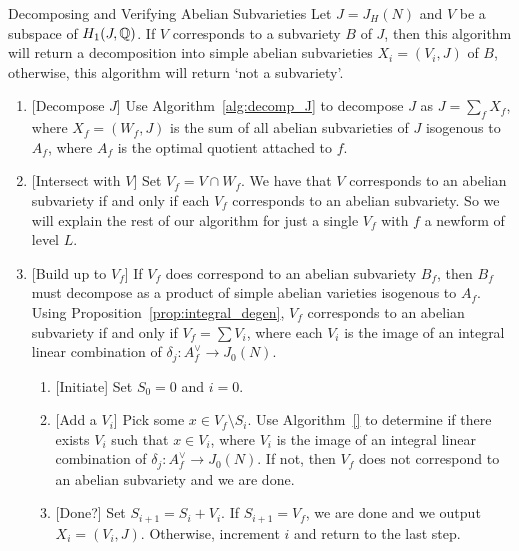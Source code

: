 \begin{algorithm}{Decomposing and Verifying Abelian Subvarieties}
    \label{alg:decomp_and_verify_subvarieties}
    Let $J=J_H(N)$ and $V$ be a subspace of $H_1(J, \mathbb{Q})$. If $V$ corresponds
    to a subvariety $B$ of $J$, then this algorithm will return a decomposition
    into simple abelian subvarieties $X_i=(V_i, J)$ of $B$, otherwise, this
    algorithm will return `not a subvariety'.
    \begin{enumerate}
        \item{} [Decompose $J$]
            Use Algorithm~\ref{alg:decomp_J} to decompose $J$ as $J=\sum_f
            X_f$, where $X_f=(W_f, J)$ is the sum of all abelian subvarieties
            of $J$ isogenous to $A_f$, where $A_f$ is the optimal quotient
            attached to $f$.
        \item{} [Intersect with $V$]
            Set $V_f=V\cap W_f$. We have that $V$ corresponds to an abelian
            subvariety if and only if each $V_f$ corresponds to an abelian
            subvariety. So we will explain the rest of our algorithm for just a
            single $V_f$ with $f$ a newform of level $L$.
        \item{} [Build up to $V_f$]
            If $V_f$ does correspond to an abelian subvariety $B_f$, then $B_f$
            must decompose as a product of simple abelian varieties isogenous
            to $A_f$. Using Proposition~\ref{prop:integral_degen}, $V_f$
            corresponds to an abelian subvariety if and only if $V_f=\sum V_i$,
            where each $V_i$ is the image of an integral linear combination of
            $\delta_j:A_f ^\vee \to J_0(N)$.
            \begin{enumerate}
                \item{} [Initiate]
                    Set $S_0=0$ and $i=0$.
                \item{} [Add a $V_i$]
                    Pick some $x\in V_f\setminus S_i$. Use Algorithm~\ref{} to
                    determine if there exists $V_i$ such that $x\in V_i$, where
                    $V_i$ is the image of an integral linear combination of
                    $\delta_j:A_f ^\vee \to J_0(N)$. If not, then $V_f$ does
                    not correspond to an abelian subvariety and we are done.
                \item{} [Done?]
                    Set $S_{i+1} = S_i + V_i$. If $S_{i+1}=V_f$, we are done
                    and we output $X_i=(V_i, J)$. Otherwise, increment $i$ and
                    return to the last step.
            \end{enumerate}
    \end{enumerate}
\end{algorithm}


